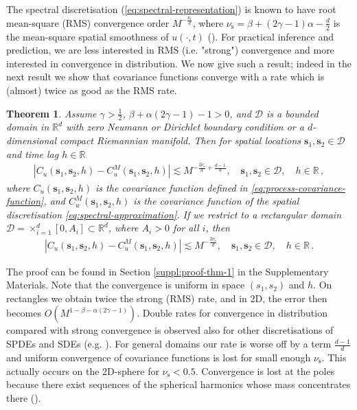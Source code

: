 \documentclass[12pt]{article} %
\newtheorem{theorem}{Theorem}
\begin{document}
The spectral discretisation (\ref{eq:spectral-representation}) is known to have %
root mean-square (RMS) convergence order $M^{-\frac{\nu_{\mathrm{s}}}{d}}$, where $\nu_\mathrm{s} = \beta + (2\gamma - 1) \alpha - \frac{d}{2}$ is the mean-square spatial smoothness of $u(\cdot, t)$ (\cite{Furset2023}). For practical inference and prediction, we are less interested in RMS (i.e. "strong") convergence and more interested in convergence in distribution. We now give such a result; indeed in the next result we show that covariance functions converge with a rate which is (almost) twice as good as the RMS rate. 

\begin{theorem} \label{thm:weak-spectral-convergence}
Assume $\gamma>\tfrac12$, $\beta + \alpha (2 \gamma - 1) - 1 > 0$, and $\mathcal{D}$ is a bounded domain in $\mathbb{R}^d$ with zero Neumann or Dirichlet boundary condition or a $d$-dimensional compact Riemannian manifold. Then for spatial locations $\mathbf{s}_1, \mathbf{s}_2 \in \mathcal{D}$ and time lag $h \in \mathbb{R}$
\begin{align*}
    \left| C_{u}(\boldsymbol{s}_1, \boldsymbol{s}_2, h) - C^M_{u}(\boldsymbol{s}_1, \boldsymbol{s}_2, h)\right| \lesssim M^{-\frac{2 \nu_\mathrm{s}}{d} + \frac{d - 1}{d}}, \quad \boldsymbol{s}_1,\boldsymbol{s}_2\in \mathcal D, \quad h \in \mathbb{R} \, ,
\end{align*}
where $C_{u}(\boldsymbol{s}_1, \boldsymbol{s}_2, h)$ is the covariance function defined in \eqref{eq:process-covariance-function}, and $C^M_{u}(\boldsymbol{s}_1, \boldsymbol{s}_2, h)$ is the covariance function of the spatial discretisation \eqref{eq:spectral-approximation}. If we restrict to a rectangular domain $\mathcal{D}=\times_{i = 1}^d [0, A_i] \subset \mathbb{R}^d$, where $A_i > 0$ for all $i$, then
\begin{align*}
    \left| C_{u}(\boldsymbol{s}_1, \boldsymbol{s}_2, h) - C^M_{u}(\boldsymbol{s}_1, \boldsymbol{s}_2, h)\right| \lesssim M^{-\frac{2 \nu_\mathrm{s}}{d}}, \quad \boldsymbol{s}_1,\boldsymbol{s}_2\in \mathcal D, \quad h \in \mathbb{R} \, .
\end{align*}
\end{theorem}
The proof can be found in Section \ref{suppl:proof-thm-1} in the Supplementary Materials. Note that the convergence is uniform in space $(s_1,s_2)$ and $h$. On rectangles we obtain twice the strong (RMS) rate, and in 2D, the error then becomes $O(M^{1 -\beta - \alpha(2 \gamma - 1)})$. Double rates for convergence in distribution compared with strong convergence is observed also for other discretisations of SPDEs and SDEs (e.g. \cite{KLL12,KP92}). For general domains our rate is worse off by a term $\frac{d - 1}{d}$ and uniform convergence of covariance functions is lost for small enough $\nu_\mathrm{s}$. This actually occurs on the 2D-sphere for $\nu_\mathrm{s} < 0.5$. Convergence is lost at the poles because there exist sequences of the spherical harmonics whose mass concentrates there (\cite{Sogge2016}).
\end{document}
